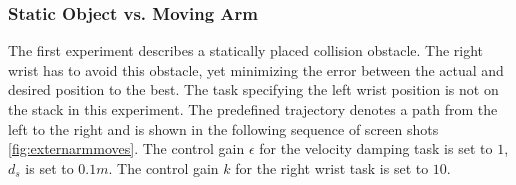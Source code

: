 \subsubsection*{Static Object vs. Moving Arm}
The first experiment describes a statically placed collision obstacle. The right wrist has to avoid this obstacle, yet minimizing the error between the actual and desired position to the best. The task specifying the left wrist position is not on the stack in this experiment. The predefined trajectory denotes a path from the left to the right and is shown in the following sequence of screen shots \ref{fig:externarmmoves}. The control gain $\epsilon$ for the velocity damping task is set to $1$, $d_s$ is set to $0.1m$. The control gain $k$ for the right wrist task is set to $10$. 
\begin{figure}[h!]
  \centering
\end{figure}
